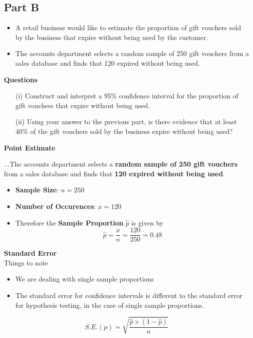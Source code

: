 \documentclass[]{article}
\begin{document}
\newpage
\subsection*{Part B}
\begin{itemize}
\item A retail business would like to estimate the proportion of gift vouchers sold by the business that expire without being used by the customer. 
\item The accounts department selects a random sample of 250 gift vouchers from a sales database and finds that 120 expired without being used.
\end{itemize}
\noindent \textbf{Questions}
\begin{itemize}
\item[(i)] Construct and interpret a 95\% confidence interval for the proportion of gift vouchers that expire without being used.

\item[(ii)] Using your answer to the previous part, is there evidence that at least 40\% of the gift vouchers sold by the business expire without being used?
\end{itemize}
\newpage
\noindent \textbf{Point Estimate}
\begin{framed}
	\noindent ...The accounts department selects a \textbf{random sample of 250 gift vouchers} from a sales database and finds that \textbf{120 expired without being used}.
\end{framed}
{
\LARGE \begin{itemize}
	\item \textbf{Sample Size}: $n=250$
	\item \textbf{Number of Occurences}: $x=120$
	\item Therefore the \textbf{Sample Proportion} $\hat{p}$ is given by
	\[\hat{p} = \frac{x}{n} =  \frac{120}{250} = 0.48 \]
\end{itemize}
}
\smallskip
\noindent \textbf{Standard Error}\\
Things to note
\begin{itemize}
	\item We are dealing with single sample proportions
	\item The standard error for confidence intervals is different to the standard error for hypothesis testing, in the case of single sample proportions.
	\end{itemize}
\[ S.E.(p)  = \sqrt{\frac{\hat{p} \times (1-\hat{p})}{n}}\]
\newpage
\end{document}
